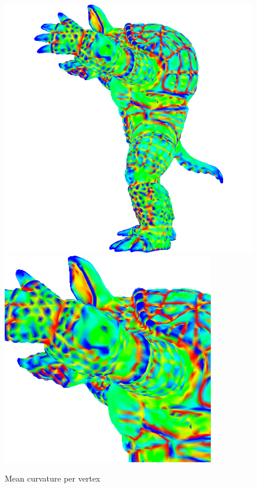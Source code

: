 \begin{figure}[!h]
    \centering
    \centering
    \includegraphics[scale=0.24]{images/mean-curvature-vertex.png}
    \endminipage\hfill
    \centering
    \includegraphics[scale=0.5]{images/mean-curvature-vertex-detail.png}
    \endminipage
    \caption{Mean curvature per vertex} \label{fig:armadillo-mean-vertex}
\end{figure}


